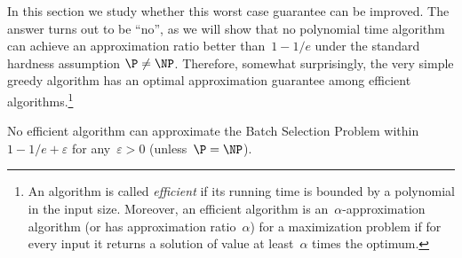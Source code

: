 In this section we study whether this worst case guarantee can be improved. The answer turns out to be ``no'', as we will show that no polynomial time algorithm can achieve an approximation ratio better than~$1 - 1/e$ under the standard hardness assumption $\P \neq \NP$.
%
Therefore, somewhat surprisingly, the very simple greedy algorithm has an optimal approximation guarantee among efficient algorithms.\footnote{An algorithm is called \emph{efficient} if its running time is bounded by a polynomial in the input size. Moreover, an efficient algorithm is an~$\alpha$-approximation algorithm (or has approximation ratio~$\alpha$) for a maximization problem if for every input it returns a solution of value at least~$\alpha$ times the optimum.}
%
\begin{theorem}
\label{theorem_hardness_batch_selection}
No efficient algorithm can approximate the Batch Selection Problem within~$1 - 1/e + \varepsilon$ for any~$\varepsilon > 0$ (unless~$\P = \NP$).
\end{theorem}
